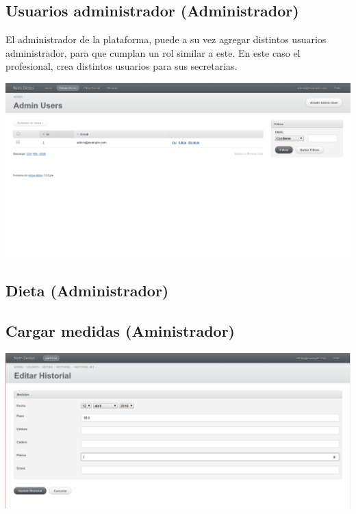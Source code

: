 \documentclass[runningheads,a4paper,spanish]{llncs}
\begin{document}
\subsection{Usuarios administrador (Administrador)}
El administrador de la plataforma, puede a su vez agregar distintos usuarios administrador, para que cumplan un rol similar a este. En este caso el profesional, crea distintos usuarios para sus secretarias.
\begin{center}
	\includegraphics[scale=0.3]{admin_users.png}
\end{center}

\subsection{Dieta (Administrador)}
\begin{center}
	
\end{center}

\subsection{Cargar medidas (Aministrador)}
\begin{center}
	\includegraphics[scale=0.3]{cargar_medida.png}
\end{center}
\end{document}
